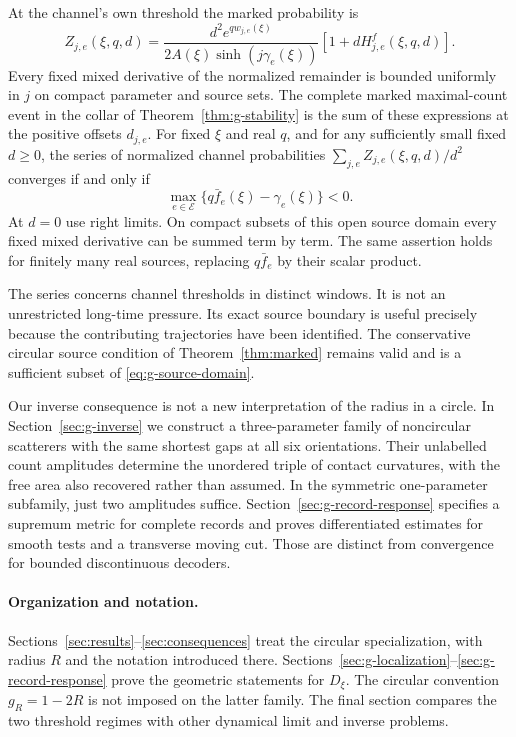 \begin{theorem}
\label{thm:g-marked}
At the channel's own threshold the marked probability is
\begin{equation}\label{eq:g-marked}
 Z_{j,e}(\xi,q,d)=
 \frac{d^2e^{q w_{j,e}(\xi)}}{2A(\xi)\sinh(j\gamma_e(\xi))}
       [1+dH_{j,e}^{f}(\xi,q,d)].
\end{equation}
Every fixed mixed derivative of the normalized remainder is bounded
uniformly in $j$ on compact parameter and source sets. The complete
marked maximal-count event in the collar of Theorem~\ref{thm:g-stability}
is the sum of these expressions at the positive offsets $d_{j,e}$.
For fixed $\xi$ and real $q$, and for any sufficiently small fixed
$d\ge0$, the series of normalized channel probabilities
$\sum_{j,e}Z_{j,e}(\xi,q,d)/d^2$ converges if and only if
\begin{equation}\label{eq:g-source-domain}
               \max_{e\in\mathcal E}\{q\bar f_e(\xi)-\gamma_e(\xi)\}<0.
\end{equation}
At $d=0$ use right limits. On compact subsets of this open source
domain every fixed mixed derivative can be summed term by term.
The same assertion holds for finitely many real sources, replacing
$q\bar f_e$ by their scalar product.
\end{theorem}

The series concerns channel thresholds in distinct windows. It is not
an unrestricted long-time pressure. Its exact source boundary is useful
precisely because the contributing trajectories have been identified.
The conservative circular source condition of Theorem~\ref{thm:marked}
remains valid and is a sufficient subset of \eqref{eq:g-source-domain}.

Our inverse consequence is not a new interpretation of the radius in a
circle. In Section~\ref{sec:g-inverse} we construct a three-parameter
family of noncircular scatterers with the same shortest gaps at all six
orientations. Their unlabelled count amplitudes determine the unordered
triple of contact curvatures, with the free area also recovered rather
than assumed. In the symmetric one-parameter subfamily, just two
amplitudes suffice. Section~\ref{sec:g-record-response} specifies a
supremum metric for complete records and proves differentiated estimates
for smooth tests and a transverse moving cut. Those are distinct from
convergence for bounded discontinuous decoders.

\paragraph{Organization and notation.}
Sections~\ref{sec:results}--\ref{sec:consequences} treat the circular
specialization, with radius $R$ and the notation introduced there.
Sections~\ref{sec:g-localization}--\ref{sec:g-record-response} prove
the geometric statements for $D_\xi$. The circular convention
$g_R=1-2R$ is not imposed on the latter family. The final section
compares the two threshold regimes with other dynamical limit and
inverse problems.
